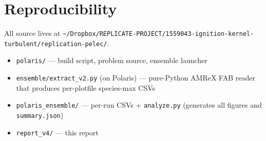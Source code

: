 \documentclass[11pt]{article}
\begin{document}
\section{Reproducibility}
All source lives at \texttt{\textasciitilde/Dropbox/REPLICATE-PROJECT/1559043-ignition-kernel-turbulent/replication-pelec/}.
\begin{itemize}
\item \texttt{polaris/} --- build script, problem source, ensemble launcher
\item \texttt{ensemble/extract\_v2.py} (on Polaris) --- pure-Python AMReX FAB
  reader that produces per-plotfile species-max CSVs
\item \texttt{polaris\_ensemble/} --- per-run CSVs + \texttt{analyze.py}
  (generates all figures and \texttt{summary.json})
\item \texttt{report\_v4/} --- this report
\end{itemize}
\end{document}
